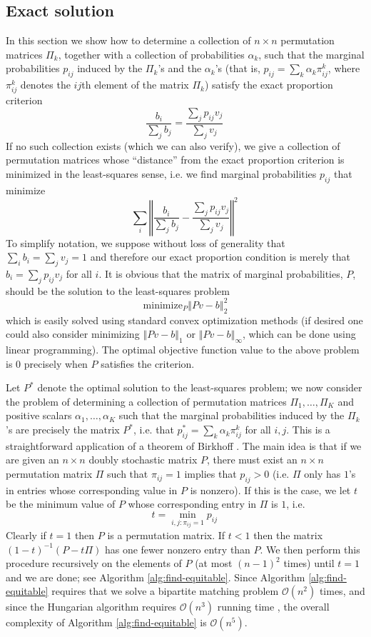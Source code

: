 \subsection{Exact solution} 
In this section we show how to determine a collection of $n\times n$
permutation matrices $\Pi_{k}$, together with a collection of
probabilities $\alpha_{k}$, such that the marginal probabilities
$p_{ij}$ induced by the $\Pi_{k}$'s and the $\alpha_{k}$'s (that is,
$p_{ij}=\sum_{k}\alpha_{k}\pi_{ij}^{k}$, where $\pi_{ij}^{k}$ denotes
the $ij$th element of the matrix $\Pi_{k}$) satisfy the exact
proportion criterion \[
\frac{b_{i}}{\sum_{j}b_{j}}=\frac{\sum_{j}p_{ij}v_{j}}{\sum_{j}v_{j}}\,\]
If no such collection exists (which we can also verify), we give a
collection of permutation matrices whose ``distance'' from the exact
proportion criterion is minimized in the least-squares sense, i.e. we
find marginal probabilities $p_{ij}$ that minimize\[
\sum_{i}\left\Vert
  \frac{b_{i}}{\sum_{j}b_{j}}-\frac{\sum_{j}p_{ij}v_{j}}{\sum_{j}v_{j}}\right\Vert
^{2}\,\] To simplify notation, we suppose without loss of generality
that $\sum_{i}b_{i}=\sum_{j}v_{j}=1$ and therefore our exact
proportion condition is merely that $b_{i}=\sum_{j}p_{ij}v_{j}$ for
all $i$. It is obvious that the matrix of marginal probabilities, $P$,
should be the solution to the least-squares problem\[
\mathrm{minimize}_{P}\left\Vert Pv-b\right\Vert _{2}^{2}\] which is
easily solved using standard convex optimization methods (if desired
one could also consider minimizing $\left\Vert Pv-b\right\Vert _{1}$
or $\left\Vert Pv-b\right\Vert _{\infty}$, which can be done using
linear programming). The optimal objective function value to the above
problem is $0$ precisely when $P$ satisfies the criterion.

Let $P^{*}$ denote the optimal solution to the least-squares problem;
we now consider the problem of determining a collection of permutation
matrices $\Pi_{1},\dots,\Pi_{K}$ and positive scalars
$\alpha_{1},\dots,\alpha_{K}$ such that the marginal probabilities
induced by the $\Pi_{k}$'s are precisely the matrix $P^{*}$, i.e. that
$p_{ij}^{*}=\sum_{k}\alpha_{k}\pi_{ij}^{k}$ for all $i,j$. This is a
straightforward application of a theorem of Birkhoff
\cite{marcus}. The main idea is that if we are given an $n\times n$
doubly stochastic matrix $P$, there must exist an $n\times n$
permutation matrix $\Pi$ such that $\pi_{ij}=1$ implies that
$p_{ij}>0$ (i.e. $\Pi$ only has $1$'s in entries whose corresponding
value in $P$ is nonzero). If this is the case, we let $t$ be the
minimum value of $P$ whose corresponding entry in $\Pi$ is $1$,
i.e. \[ t=\min_{i,j:\pi_{ij}=1}p_{ij}\,\] Clearly if $t=1$ then $P$ is
a permutation matrix. If $t<1$ then the matrix $(1-t)^{-1}(P-t\Pi)$
has one fewer nonzero entry than $P$. We then perform this procedure
recursively on the elements of $P$ (at most $(n-1)^{2}$ times) until
$t=1$ and we are done; see Algorithm \ref{alg:find-equitable}.  Since
Algorithm \ref{alg:find-equitable} requires that we solve a bipartite
matching problem $\mathcal{O}(n^2)$ times, and since the Hungarian
algorithm requires $\mathcal{O}(n^3)$ running time
\citep{burkard2009assignment}, the overall complexity of Algorithm
\ref{alg:find-equitable} is $\mathcal{O}(n^5)$.

